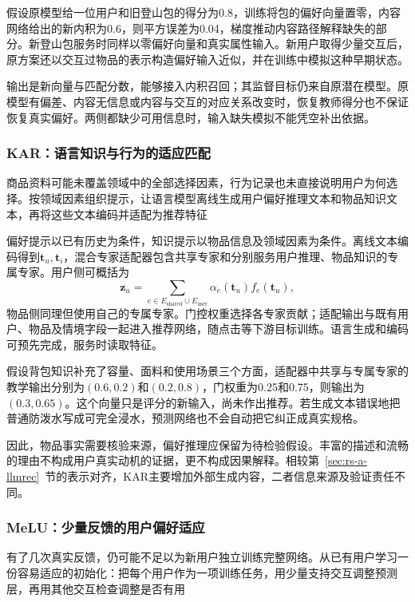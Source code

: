 假设原模型给一位用户和旧登山包的得分为0.8，训练将包的偏好向量置零，内容网络给出的新内积为0.6，则平方误差为0.04，梯度推动内容路径解释缺失的部分。新登山包服务时同样以零偏好向量和真实属性输入。新用户取得少量交互后，原方案还以交互过物品的表示构造偏好输入近似，并在训练中模拟这种早期状态。

输出是新向量与匹配分数，能够接入内积召回；其监督目标仍来自原潜在模型。原模型有偏差、内容无信息或内容与交互的对应关系改变时，恢复教师得分也不保证恢复真实偏好。两侧都缺少可用信息时，输入缺失模拟不能凭空补出依据。

\subsubsection{KAR：语言知识与行为的适应匹配}
\label{sec:rs-kar}

商品资料可能未覆盖领域中的全部选择因素，行为记录也未直接说明用户为何选择。按领域因素组织提示，让语言模型离线生成用户偏好推理文本和物品知识文本，再将这些文本编码并适配为推荐特征

偏好提示以已有历史为条件，知识提示以物品信息及领域因素为条件。离线文本编码得到$\bm{t}_u,\bm{t}_i$，混合专家适配器包含共享专家和分别服务用户推理、物品知识的专属专家。用户侧可概括为
\[
  \bm{z}_u=\sum_{e\in E_{\mathrm{shared}}\cup E_{\mathrm{user}}}
                \alpha_e(\bm{t}_u)f_e(\bm{t}_u),
\]
物品侧同理但使用自己的专属专家。门控权重选择各专家贡献；适配输出与既有用户、物品及情境字段一起进入推荐网络，随点击等下游目标训练。语言生成和编码可预先完成，服务时读取特征。

假设背包知识补充了容量、面料和使用场景三个方面，适配器中共享与专属专家的教学输出分别为$(0.6,0.2)$和$(0.2,0.8)$，门权重为0.25和0.75，则输出为$(0.3,0.65)$。这个向量只是评分的新输入，尚未作出推荐。若生成文本错误地把普通防泼水写成可完全浸水，预测网络也不会自动把它纠正成真实规格。

因此，物品事实需要核验来源，偏好推理应保留为待检验假设。丰富的描述和流畅的理由不构成用户真实动机的证据，更不构成因果解释。相较第~\ref{sec:rs-a-llmrec}~节的表示对齐，KAR主要增加外部生成内容，二者信息来源及验证责任不同。

\subsubsection{MeLU：少量反馈的用户偏好适应}
\label{sec:rs-melu}

有了几次真实反馈，仍可能不足以为新用户独立训练完整网络。从已有用户学习一份容易适应的初始化：把每个用户作为一项训练任务，用少量支持交互调整预测层，再用其他交互检查调整是否有用

